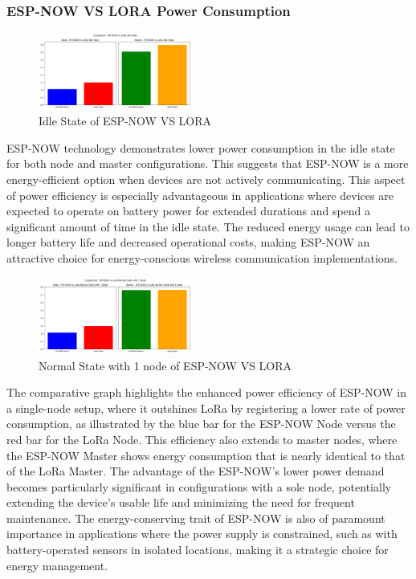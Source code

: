 \subsubsection{ESP-NOW VS LORA Power Consumption}\label{sec:esp_lora_power_consumption}
\begin{figure}[H]
  \begin{center}
    \includegraphics[width=0.45\textwidth]{./Figures/Average_Power_Consumption/ESP-NOW_vs_LORA_Idle.png}
  \end{center}
  \caption{Idle State of ESP-NOW VS LORA}\label{fig:esp_lora_idle}
\end{figure}

ESP-NOW technology demonstrates lower power consumption in the idle state for both node and master configurations. This suggests that ESP-NOW is a more energy-efficient option when devices are not actively communicating. This aspect of power efficiency is especially advantageous in applications where devices are expected to operate on battery power for extended durations and spend a significant amount of time in the idle state. The reduced energy usage can lead to longer battery life and decreased operational costs, making ESP-NOW an attractive choice for energy-conscious wireless communication implementations.

\begin{figure}[H]
  \begin{center}
    \includegraphics[width=0.45\textwidth]{./Figures/Average_Power_Consumption/ESP-NOW_vs_LORA_Normal_1_node.png}
  \end{center}
  \caption{Normal State with 1 node of ESP-NOW VS LORA}\label{fig:esp_lora_1}
\end{figure}

The comparative graph highlights the enhanced power efficiency of ESP-NOW in a single-node setup, where it outshines LoRa by registering a lower rate of power consumption, as illustrated by the blue bar for the ESP-NOW Node versus the red bar for the LoRa Node. This efficiency also extends to master nodes, where the ESP-NOW Master shows energy consumption that is nearly identical to that of the LoRa Master. The advantage of the ESP-NOW's lower power demand becomes particularly significant in configurations with a sole node, potentially extending the device's usable life and minimizing the need for frequent maintenance. The energy-conserving trait of ESP-NOW is also of paramount importance in applications where the power supply is constrained, such as with battery-operated sensors in isolated locations, making it a strategic choice for energy management.

